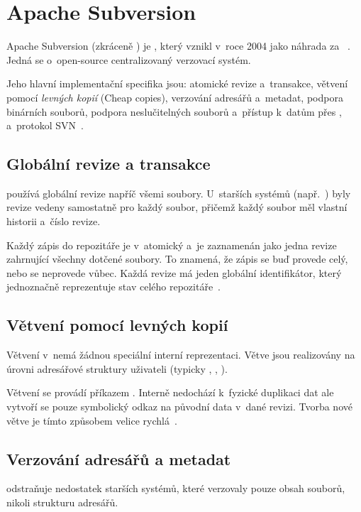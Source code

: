 \section{Apache Subversion}
\label{sec:svn}
Apache Subversion (zkráceně \SVN) je \VCS, který vznikl v~roce 2004 jako náhrada za \CVS~\cite{svnbook17}. Jedná se o~open-source centralizovaný verzovací systém.

Jeho hlavní implementační specifika jsou: atomické revize a~transakce, větvení pomocí \textit{levných kopií} (Cheap copies), verzování adresářů a~metadat, podpora binárních souborů, podpora neslučitelných souborů a~přístup k~datům přes \HTTP, \HTTPS a~protokol SVN~\cite{svnbook17}.

\subsection*{Globální revize a transakce}
\label{sec:svn_revisions}
\SVN používá globální revize napříč všemi soubory. U~starších systémů (např.\ \CVS) byly revize vedeny samostatně pro každý soubor, přičemž každý soubor měl vlastní historii a~číslo revize.

Každý zápis do repozitáře je v~\SVN atomický a~je zaznamenán jako jedna revize zahrnující všechny dotčené soubory. To znamená, že zápis se buď provede celý, nebo se neprovede vůbec. Každá revize má jeden globální identifikátor, který jednoznačně reprezentuje stav celého repozitáře~\cite{svnbook17}.


\subsection*{Větvení pomocí levných kopií}
\label{sec:svn_branching}
Větvení v~\SVN nemá žádnou speciální interní reprezentaci. Větve jsou realizovány na úrovni adresářové struktury uživateli (typicky , , ).

Větvení se provádí příkazem . Interně nedochází k~fyzické duplikaci dat ale vytvoří se pouze symbolický odkaz na původní data v~dané revizi. Tvorba nové větve je tímto způsobem velice rychlá~\cite{svnbook17}.


\subsection*{Verzování adresářů a metadat}
\label{sec:svn_metadata}
\SVN odstraňuje nedostatek starších systémů, které verzovaly pouze obsah souborů, nikoli strukturu adresářů.


